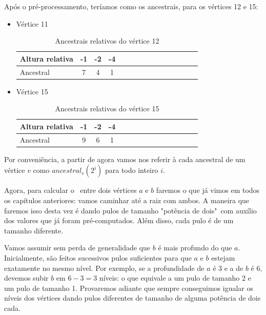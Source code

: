 Após o pré-processamento, teríamos como os ancestrais, para os vértices 12 e 15:

\begin{itemize}
    \item Vértice 11

    \begin{table}[htb]
    \centering
    \begin{tabular}{|l|c|c|c|c|c|c|c|c|c|c|c|c|c|c|}
    \hline
    Altura relativa & -1 & -2 & -4 \\ \hline
    Ancestral       & 7 & 4  & 1 \\ \hline
    \end{tabular}
    \caption{Ancestrais relativos do vértice 12}
    \end{table}
    
    \item Vértice 15
    
    \begin{table}[htb]
    \centering
    \begin{tabular}{|l|c|c|c|c|c|c|c|c|c|c|c|c|c|c|}
    \hline
    Altura relativa & -1 & -2 & -4 \\ \hline
    Ancestral       & 9  & 6  & 1 \\ \hline
    \end{tabular}
    \caption{Ancestrais relativos do vértice 15}
    \end{table}

\end{itemize}

Por conveniência, a partir de agora vamos nos referir à cada ancestral de um vértice $v$ como $ancestral_v(2^i)$ para todo inteiro $i$.

Agora, para calcular o \LCA\ entre dois vértices $a$ e $b$ faremos o que já vimos em todos os capítulos anteriores: vamos caminhar até a raiz com ambos. A maneira que faremos isso desta vez é dando pulos de tamanho "potência de dois"\  com auxílio dos valores que já foram pré-computados. Além disso, cada pulo é de um tamanho diferente.

Vamos assumir sem perda de generalidade que $b$ é mais profundo do que $a$. Inicialmente, são feitos sucessivos pulos suficientes para que $a$ e $b$ estejam exatamente no mesmo nível. Por exemplo, se a profundidade de $a$ é 3 e a de $b$ é 6, devemos subir $b$ em $6 - 3 = 3$ níveis: o que equivale a um pulo de tamanho 2 e um pulo de tamanho 1. Provaremos adiante que sempre conseguimos igualar os níveis dos vértices dando pulos diferentes de tamanho de alguma potência de dois cada.

